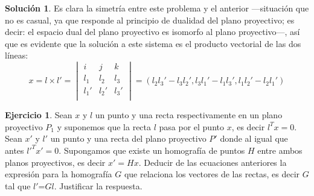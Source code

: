 \documentclass[a4paper, 11pt]{article}
\theoremstyle{definition}
\newtheorem{ejercicio}{Ejercicio}
\newtheorem*{solucion}{Solución}
\theoremstyle{theorem}
\begin{document}
\begin{solucion}
      Es clara la simetría entre este problema y el anterior ---situación que no es casual, ya que responde al principio de dualidad del plano proyectivo; es decir: el espacio dual del plano proyectivo es isomorfo al plano proyectivo---, así que es evidente que la solución a este sistema es el producto vectorial de las dos líneas:
      \[
      x = l \times l' =
      \begin{vmatrix}
          i & j & k \\
          l_1 & l_2 & l_3 \\
          l_1' & l_2' & l_3' \\
      \end{vmatrix} =
      (l_2l_3'-l_3l_2', l_3l_1'-l_1l_3', l_1l_2'-l_2l_1')
      \]
  \end{solucion}

  \begin{ejercicio}
      Sean $x$ y $l$ un punto y una recta respectivamente en un plano proyectivo $P_1$ y suponemos que la recta $l$ pasa por el punto $x$, es decir $l^Tx=0$. Sean $x'$ y $l'$ un punto y una recta del plano proyectivo $P'$ donde al igual que antes $l'^Tx'=0$. Supongamos que existe un homografía de puntos $H$ entre ambos planos proyectivos, es decir $x'=Hx$. Deducir de las ecuaciones anteriores la expresión para la homografía $G$ que relaciona los vectores de las rectas, es decir $G$ tal que $l'$=$Gl$. Justificar la respuesta.
  \end{ejercicio}
\end{document}
